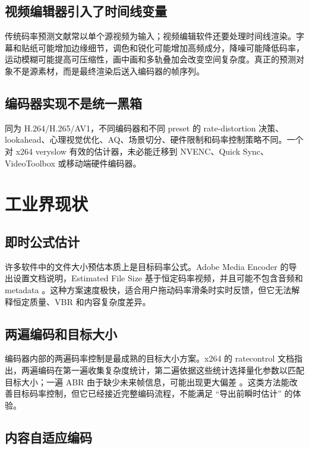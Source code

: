 \documentclass[UTF8,a4paper,11pt]{ctexart}
\begin{document}
\subsection{视频编辑器引入了时间线变量}

传统码率预测文献常以单个源视频为输入；视频编辑软件还要处理时间线渲染。字幕和贴纸可能增加边缘细节，调色和锐化可能增加高频成分，降噪可能降低码率，运动模糊可能提高可压缩性，画中画和多轨叠加会改变空间复杂度。真正的预测对象不是源素材，而是最终渲染后送入编码器的帧序列。

\subsection{编码器实现不是统一黑箱}

同为 H.264/H.265/AV1，不同编码器和不同 preset 的 rate-distortion 决策、lookahead、心理视觉优化、AQ、场景切分、硬件限制和码率控制策略不同。一个对 x264 veryslow 有效的估计器，未必能迁移到 NVENC、Quick Sync、VideoToolbox 或移动端硬件编码器。

\section{工业界现状}

\subsection{即时公式估计}

许多软件中的文件大小预估本质上是目标码率公式。Adobe Media Encoder 的导出设置文档说明，Estimated File Size 基于恒定码率视频，并且可能不包含音频和 metadata \cite{adobe_export_settings}。这种方案速度极快，适合用户拖动码率滑条时实时反馈，但它无法解释恒定质量、VBR 和内容复杂度差异。

\subsection{两遍编码和目标大小}

编码器内部的两遍码率控制是最成熟的目标大小方案。x264 的 ratecontrol 文档指出，两遍编码在第一遍收集复杂度统计，第二遍依据这些统计选择量化参数以匹配目标大小；一遍 ABR 由于缺少未来帧信息，可能出现更大偏差 \cite{x264_ratecontrol}。这类方法能改善目标码率控制，但它已经接近完整编码流程，不能满足 ``导出前瞬时估计'' 的体验。

\subsection{内容自适应编码}
\end{document}
